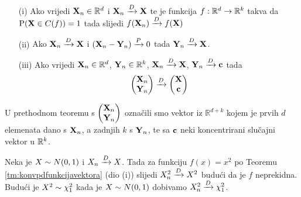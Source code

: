 \begin{tm} \label{tm:konvpdfunkcijavektora}
	{} \nopagebreak
	\begin{itemize}
		\item[(i)]{Ako vrijedi $\tsvek{X}_n \in \mathbb{R}^d$ i 
			$\konvpd{\tsvek{X}_n}{\tsvek{X}}$
			te je funkcija $f:\mathbb{R}^d \rightarrow \mathbb{R}^k$
			takva da $\vP(\tsvek{X} \in C(f)) = 1$ 
			tada slijedi $\konvpd{f(\tsvek{X}_n)}{f(\tsvek{X})}$}
		\item[(ii)]{Ako $\konvpd{\tsvek{X}_n}{\tsvek{X}}$ i
			$\konvpv{(\tsvek{X}_n-\tsvek{Y}_n)}{0}$ 
			tada
			$\konvpd{\tsvek{Y}_n}{\tsvek{X}}$.}
		\item[(iii)]{Ako vrijedi $\tsvek{X}_n \in \mathbb{R}^d$,
			$\tsvek{Y}_n \in \mathbb{R}^k$,
			$\konvpd{\tsvek{X}_n}{\tsvek{X}}$,
			$\konvpd{\tsvek{Y}_n}{\tv{c}}$ tada
			\begin{equation}
				\konvpd{
					\begin{pmatrix}
						\tsvek{X}_n \\
						\tsvek{Y}_n \\
					\end{pmatrix}
				}{
					\begin{pmatrix}
						\tsvek{X} \\
						\tv{c} \\
					\end{pmatrix}
				}
			\end{equation}
		}
	\end{itemize}
\end{tm}

U prethodnom teoremu s
$
\begin{pmatrix}
	\tsvek{X}_n \\
	\tsvek{Y}_n \\
\end{pmatrix}
$
označili smo vektor iz $\mathbb{R}^{d+k}$ kojem je prvih $d$ elemenata
dano s $\tsvek{X}_n$, a zadnjih $k$ s $\tsvek{Y}_n$, te sa $\tv{c}$
neki koncentrirani slučajni vektor u $\mathbb{R}^k$.

\begin{primjer_}
	Neka je $\tsvar{X} \sim N(0,1)$ i $\konvpd{\tsvar{X}_n}{\tsvar{X}}$.
	Tada za funkciju
	$f(x)=x^2$ po Teoremu \ref{tm:konvpdfunkcijavektora}
	(dio (i)) slijedi $\konvpd{\tsvar{X}_{n}^{2}}{\tsvar{X}^2}$ budući da je
	$f$ neprekidna. Budući je $\tsvar{X}^2 \sim \chi_{1}^{2}$ kada je
	$\tsvar{X} \sim N(0,1)$ dobivamo $\konvpd{\tsvar{X}_{n}^{2}}{\chi_{1}^{2}}$.
\end{primjer_}

